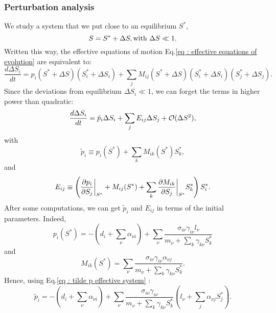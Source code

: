 \documentclass[12pt, titlepage]{report}
\begin{document}
\subsubsection{Perturbation analysis}
We study a system that we put close to an equilibrium $S^*$, \ie
\begin{equation}
S=S^*+\Delta S, \\ \text{with } \Delta S \ll 1.
\end{equation}
Written this way, the effective equations of motion Eq.\eqref{eq : effective equations of evolution} are equivalent to:
\begin{equation}
\frac{d\Delta S_i}{dt} = p_i(S^*+\Delta S)\left(S^*_i + \Delta S_i\right)+\sum_j M_{ij}(S^*+\Delta S)\left(S^*_i +\Delta S_i\right)\left(S^*_j +\Delta S_j\right).
\end{equation}
Since the deviations from equilibrium $\Delta S_i \ll 1$, we can forget the terms in higher power than quadratic:
\begin{equation}
\frac{d\Delta S_i}{dt} = \tilde{p}_i \Delta S_i + \sum_j E_{ij} \Delta S_j + \mathcal{O}(\Delta S^2),\label{eq : effective equ evol at O(D2)}
\end{equation}
with
\begin{equation}
\tilde{p}_i \equiv p_i(S^*) + \sum_k M_{ik}(S^*)S_k^*, \label{eq : tilde p effective system}
\end{equation}
and
\begin{equation}
E_{ij} \equiv \left(\dfrac{\partial p_i}{\partial S_j}\bigg\rvert_{S^*}+M_{ij}(S^*)+\sum_k \dfrac{\partial M_{ik}}{\partial S_j}\bigg\rvert_{S^*}S^*_k\right)S^*_i.
\end{equation}
After some computations, we can get $\tilde{p}_i$ and $E_{ij}$ in terms of the initial parameters. Indeed,
\begin{equation}
p_i(S^*)= -\left(d_i + \sum_\nu \alpha_{\nu i}\right) + \sum_\nu \frac{\sigma_{i\nu}\gamma_{i\nu}l_\nu}{m_\nu + \sum_k \gamma_{k\nu}S^*_k}
\end{equation}
and
\begin{equation}
M_{ik}(S^*) = \sum_\nu \frac{\sigma_{i\nu}\gamma_{i\nu}\alpha_{\nu j}}{m_\nu + \sum_k \gamma_{k\nu}S^*_k}.
\end{equation}
Hence, using Eq.\eqref{eq : tilde p effective system} :
\begin{equation}
\tilde{p}_i = - \left(d_i + \sum_\nu \alpha_{\nu i}\right) + \sum_\nu \frac{\sigma_{i\nu}\gamma_{i\nu}}{m_\nu + \sum_k \gamma_{k\nu}S^*_k}\left(l_\nu+\sum_{j}\alpha_{\nu j} S^*_j\right).
\end{equation}
\end{document}
